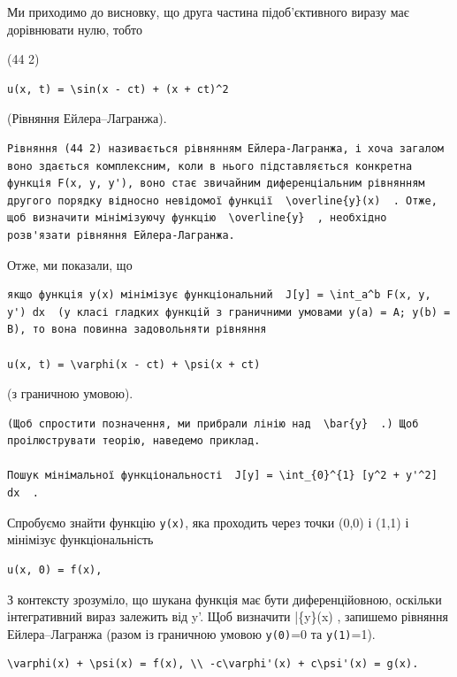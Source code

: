 \documentclass[
  ukrainian,
]{article}
\begin{document}
Ми приходимо до висновку, що друга частина підоб'єктивного виразу має
дорівнювати нулю, тобто

(44 2)

\begin{verbatim}
u(x, t) = \sin(x - ct) + (x + ct)^2
\end{verbatim}

(Рівняння Ейлера--Лагранжа).

\begin{verbatim}
Рівняння (44 2) називається рівнянням Ейлера-Лагранжа, і хоча загалом воно здається комплексним, коли в нього підставляється конкретна функція F(x, y, y'), воно стає звичайним диференціальним рівнянням другого порядку відносно невідомої функції  \overline{y}(x)  . Отже, щоб визначити мінімізуючу функцію  \overline{y}  , необхідно розв'язати рівняння Ейлера-Лагранжа.
\end{verbatim}

Отже, ми показали, що

\begin{verbatim}
якщо функція y(x) мінімізує функціональний  J[y] = \int_a^b F(x, y, y') dx  (у класі гладких функцій з граничними умовами y(a) = A; y(b) = B), то вона повинна задовольняти рівняння

u(x, t) = \varphi(x - ct) + \psi(x + ct)
\end{verbatim}

(з граничною умовою).

\begin{verbatim}
(Щоб спростити позначення, ми прибрали лінію над  \bar{y}  .) Щоб проілюструвати теорію, наведемо приклад.

Пошук мінімальної функціональності  J[y] = \int_{0}^{1} [y^2 + y'^2] dx  .
\end{verbatim}

Спробуємо знайти функцію \texttt{y(x)}, яка проходить через точки (0,0)
і (1,1) і мінімізує функціональність

\begin{verbatim}
u(x, 0) = f(x),
\end{verbatim}

З контексту зрозуміло, що шукана функція має бути диференційовною,
оскільки інтегративний вираз залежить від y'. Щоб визначити \bar\{y\}(x)
, запишемо рівняння Ейлера--Лагранжа (разом із граничною умовою
\texttt{y(0)}=0 та \texttt{y(1)}=1).

\begin{verbatim}
\varphi(x) + \psi(x) = f(x), \\ -c\varphi'(x) + c\psi'(x) = g(x).
\end{verbatim}
\end{document}
